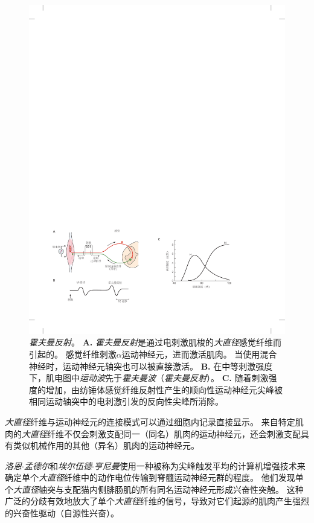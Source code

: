 \begin{figure}[htbp]
	\centering
	\includegraphics[width=1.0\linewidth]{chap32/fig_32_4}
	\caption{\textit{霍夫曼反射}。
		\textbf{A.} \textit{霍夫曼反射}是通过电刺激肌梭的\textit{大直径}感觉纤维而引起的。
		感觉纤维刺激$\alpha$运动神经元，进而激活肌肉。
		当使用混合神经时，运动神经元轴突也可以被直接激活。
		\textbf{B.} 在中等刺激强度下，肌电图中\textit{运动波}先于\textit{霍夫曼波}（\textit{霍夫曼反射}）。
		\textbf{C.} 随着刺激强度的增加，由纺锤体感觉纤维反射性产生的顺向性运动神经元尖峰被相同运动轴突中的电刺激引发的反向性尖峰所消除。}
	\label{fig:32_4}
\end{figure}


\textit{大直径}纤维与运动神经元的连接模式可以通过细胞内记录直接显示。
来自特定肌肉的\textit{大直径}纤维不仅会刺激支配同一（同名）肌肉的运动神经元，还会刺激支配具有类似机械作用的其他（异名）肌肉的运动神经元。


\textit{洛恩$\cdot$孟德尔}和\textit{埃尔伍德$\cdot$亨尼曼}使用一种被称为尖峰触发平均的计算机增强技术来确定单个\textit{大直径}纤维中的动作电位传输到脊髓运动神经元群的程度。
他们发现单个\textit{大直径}轴突与支配猫内侧腓肠肌的所有同名运动神经元形成兴奋性突触。
这种广泛的分歧有效地放大了单个\textit{大直径}纤维的信号，导致对它们起源的肌肉产生强烈的兴奋性驱动（自源性兴奋）。


